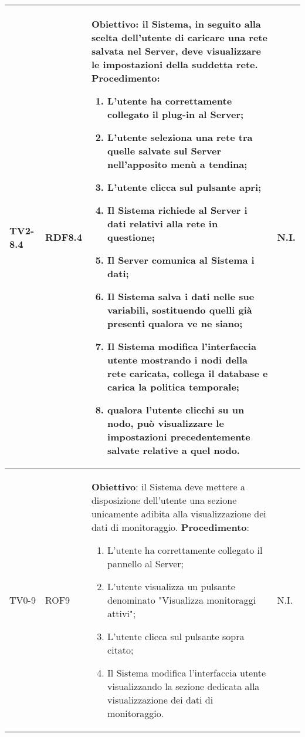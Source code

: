 \begin{longtable}{|C{.15\textwidth}|C{.13\textwidth}|m{.52\textwidth}|C{.08\textwidth}|}
TV2-8.4 & RDF8.4 &
	\textbf{Obiettivo}: il Sistema, in seguito alla scelta dell'utente di caricare una rete salvata nel Server, deve visualizzare le impostazioni della suddetta rete. \newline
	\textbf{Procedimento}:
	\begin{enumerate}
		\item L'utente ha correttamente collegato il plug-in al Server;
		\item L'utente seleziona una rete tra quelle salvate sul Server nell'apposito menù a tendina;
		\item L'utente clicca sul pulsante apri;
		\item Il Sistema richiede al Server i dati relativi alla rete in questione;
		\item Il Server comunica al Sistema i dati;
		\item Il Sistema salva i dati nelle sue variabili, sostituendo quelli già presenti qualora ve ne siano;
		\item Il Sistema modifica l'interfaccia utente mostrando i nodi della rete caricata, collega il database e carica la politica temporale;
		\item qualora l'utente clicchi su un nodo, può visualizzare le impostazioni precedentemente salvate relative a quel nodo.
	\end{enumerate}
	& N.I. \\
\hline	

TV0-9 & ROF9 &
	\textbf{Obiettivo}: il Sistema deve mettere a disposizione dell'utente una sezione unicamente adibita alla visualizzazione dei dati di monitoraggio. \newline
	\textbf{Procedimento}:
	\begin{enumerate}
		\item L'utente ha correttamente collegato il pannello al Server;
		\item L'utente visualizza un pulsante denominato "Visualizza monitoraggi attivi";
		\item L'utente clicca sul pulsante sopra citato;
		\item Il Sistema modifica l'interfaccia utente visualizzando la sezione dedicata alla visualizzazione dei dati di monitoraggio.
	\end{enumerate}
	& N.I. \\
\hline	


\end{longtable}
